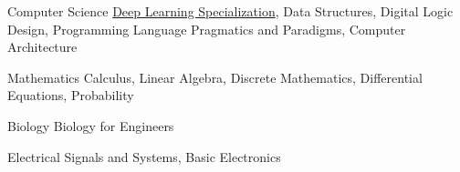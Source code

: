 

\begin{cvskills}

  \cvskill
    {Computer Science} %
    {{\href{https://www.coursera.org/specializations/deep-learning}{Deep Learning Specialization}}, Data Structures, Digital Logic Design, Programming Language Pragmatics and Paradigms, Computer Architecture} %


  \cvskill
    {Mathematics} %
    {Calculus, Linear Algebra, Discrete Mathematics, Differential Equations, Probability} %


\cvskill
{Biology} %
{Biology for Engineers}


\cvskill
{Electrical} %
{Signals and Systems, Basic Electronics} %


\end{cvskills}
